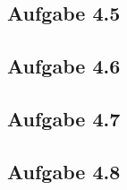 \documentclass{standalone}
\begin{document}
 

\subsection{Aufgabe 4.5}

\subsection{Aufgabe 4.6}

\subsection{Aufgabe 4.7}

\subsection{Aufgabe 4.8}
\end{document}
